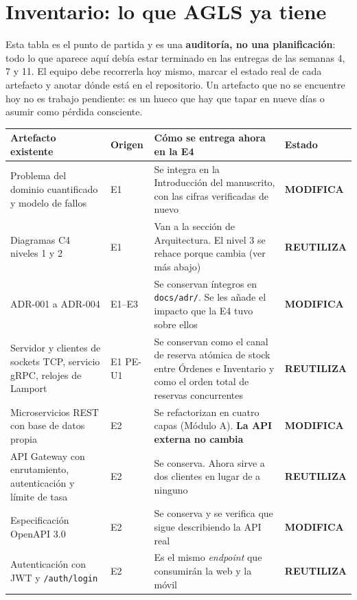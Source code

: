 \documentclass[11pt,a4paper]{article}
\newcommand{\reuso}{\cellcolor{filaReuso}\textbf{REUTILIZA}}
\newcommand{\cambia}{\cellcolor{filaCambia}\textbf{MODIFICA}}
\begin{document}
\section{Inventario: lo que AGLS ya tiene}

Esta tabla es el punto de partida y es una \textbf{auditoría, no una planificación}: todo lo que aparece aquí debía estar terminado en las entregas de las semanas 4, 7 y 11. El equipo debe recorrerla hoy mismo, marcar el estado real de cada artefacto y anotar dónde está en el repositorio. Un artefacto que no se encuentre hoy no es trabajo pendiente: es un hueco que hay que tapar en nueve días o asumir como pérdida consciente.

\begin{center}
	\footnotesize
	\begin{longtable}{@{}p{3.7cm}p{1.5cm}p{5.2cm}p{4.4cm}@{}}
		\toprule
		\textbf{Artefacto existente} & \textbf{Origen} & \textbf{Cómo se entrega ahora en la E4} & \textbf{Estado} \\
		\midrule
		\endhead
		Problema del dominio cuantificado y modelo de fallos & E1 & Se integra en la Introducción del manuscrito, con las cifras verificadas de nuevo & \cambia \\
		\addlinespace
		Diagramas C4 niveles 1 y 2 & E1 & Van a la sección de Arquitectura. El nivel 3 se rehace porque cambia (ver más abajo) & \reuso \\
		\addlinespace
		ADR-001 a ADR-004 & E1--E3 & Se conservan íntegros en \texttt{docs/adr/}. Se les añade el impacto que la E4 tuvo sobre ellos & \cambia \\
		\addlinespace
		Servidor y clientes de sockets TCP, servicio gRPC, relojes de Lamport & E1 \newline PE-U1 & Se conservan como el canal de reserva atómica de stock entre Órdenes e Inventario y como el orden total de reservas concurrentes & \reuso \\
		\addlinespace
		Microservicios REST con base de datos propia & E2 & Se refactorizan en cuatro capas (Módulo A). \textbf{La API externa no cambia} & \cambia \\
		\addlinespace
		API Gateway con enrutamiento, autenticación y límite de tasa & E2 & Se conserva. Ahora sirve a dos clientes en lugar de a ninguno & \reuso \\
		\addlinespace
		Especificación OpenAPI 3.0 & E2 & Se conserva y se verifica que sigue describiendo la API real & \cambia \\
		\addlinespace
		Autenticación con JWT y \texttt{/auth/login} & E2 & Es el mismo \emph{endpoint} que consumirán la web y la móvil & \reuso \\

\end{longtable}
\end{center}
\end{document}

